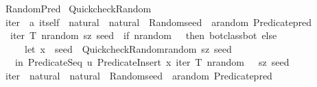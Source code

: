 %
\begin{isabellebody}%
%
%
\isadelimdocument
%
\endisadelimdocument
%
\isatagdocument
%
\isamarkuptrue%
%
\endisatagdocument
{\isafolddocument}%
%
\isadelimdocument
%
\endisadelimdocument
%
\isadelimtheory
%
\endisadelimtheory
%
\isatagtheory
{}\isamarkupfalse%
\ Random{\isacharunderscore}{\kern0pt}Pred\isanewline
{}\ Quickcheck{\isacharunderscore}{\kern0pt}Random\isanewline
{}%
\endisatagtheory
{\isafoldtheory}%
%
\isadelimtheory
\isanewline
%
\endisadelimtheory
\isanewline
{}\isamarkupfalse%
\ iter{\isacharprime}{\kern0pt}\ {\isacharcolon}{\kern0pt}{\isacharcolon}{\kern0pt}\ {\isachardoublequoteopen}{\isacharprime}{\kern0pt}a\ itself\ {\isasymRightarrow}\ natural\ {\isasymRightarrow}\ natural\ {\isasymRightarrow}\ Random{\isachardot}{\kern0pt}seed\ {\isasymRightarrow}\ {\isacharparenleft}{\kern0pt}{\isacharprime}{\kern0pt}a{\isacharcolon}{\kern0pt}{\isacharcolon}{\kern0pt}random{\isacharparenright}{\kern0pt}\ Predicate{\isachardot}{\kern0pt}pred{\isachardoublequoteclose}\isanewline
{}\isanewline
\ \ {\isachardoublequoteopen}iter{\isacharprime}{\kern0pt}\ T\ nrandom\ sz\ seed\ {\isacharequal}{\kern0pt}\ {\isacharparenleft}{\kern0pt}if\ nrandom\ {\isacharequal}{\kern0pt}\ {}\ then\ bot{\isacharunderscore}{\kern0pt}class{\isachardot}{\kern0pt}bot\ else\isanewline
\ \ \ \ \ let\ {\isacharparenleft}{\kern0pt}{\isacharparenleft}{\kern0pt}x{\isacharcomma}{\kern0pt}\ {\isacharunderscore}{\kern0pt}{\isacharparenright}{\kern0pt}{\isacharcomma}{\kern0pt}\ seed{\isacharprime}{\kern0pt}{\isacharparenright}{\kern0pt}\ {\isacharequal}{\kern0pt}\ Quickcheck{\isacharunderscore}{\kern0pt}Random{\isachardot}{\kern0pt}random\ sz\ seed\isanewline
\ \ \ in\ Predicate{\isachardot}{\kern0pt}Seq\ {\isacharparenleft}{\kern0pt}{\isacharpercent}{\kern0pt}u{\isachardot}{\kern0pt}\ Predicate{\isachardot}{\kern0pt}Insert\ x\ {\isacharparenleft}{\kern0pt}iter{\isacharprime}{\kern0pt}\ T\ {\isacharparenleft}{\kern0pt}nrandom\ {\isacharminus}{\kern0pt}\ {}{\isacharparenright}{\kern0pt}\ sz\ seed{\isacharprime}{\kern0pt}{\isacharparenright}{\kern0pt}{\isacharparenright}{\kern0pt}{\isacharparenright}{\kern0pt}{\isachardoublequoteclose}\isanewline
\isanewline
{}\isamarkupfalse%
\ iter\ {\isacharcolon}{\kern0pt}{\isacharcolon}{\kern0pt}\ {\isachardoublequoteopen}natural\ {\isasymRightarrow}\ natural\ {\isasymRightarrow}\ Random{\isachardot}{\kern0pt}seed\ {\isasymRightarrow}\ {\isacharparenleft}{\kern0pt}{\isacharprime}{\kern0pt}a{\isacharcolon}{\kern0pt}{\isacharcolon}{\kern0pt}random{\isacharparenright}{\kern0pt}\ Predicate{\isachardot}{\kern0pt}pred{\isachardoublequoteclose}\isanewline

\end{isabellebody}
